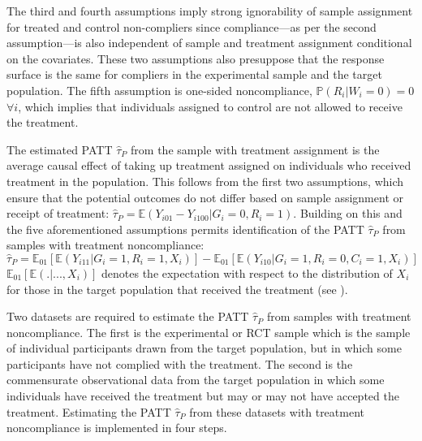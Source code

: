 The third and fourth assumptions imply strong ignorability of sample
assignment for treated and control non-compliers since compliance---as
per the second assumption---is also independent of sample and treatment
assignment conditional on the covariates. These two assumptions also
presuppose that the response surface is the same for compliers in the
experimental sample and the target population. The fifth assumption is
one-sided noncompliance, \(\mathbb{P}(R_{i}|W_{i}=0)=0\) \(\forall i\),
which implies that individuals assigned to control are not allowed to
receive the treatment.

The estimated PATT \(\widehat{\tau}_{P}\) from the sample with treatment
assignment is the average causal effect of taking up treatment assigned
on individuals who received treatment in the population. This follows
from the first two assumptions, which ensure that the potential outcomes
do not differ based on sample assignment or receipt of treatment:
\(\widehat{\tau}_{P}=\mathbb{E}\left(Y_{i01}-Y_{i100}|G_{i}=0, R_{i}=1\right)\).
Building on this and the five aforementioned assumptions permits
identification of the PATT \(\widehat{\tau}_{P}\) from samples with
treatment noncompliance:
\[\widehat{\tau}_{P}=\mathbb{E}_{01}\left[\mathbb{E}(Y_{i11}|G_{i}=1,R_{i}=1,X_{i})\right]-\mathbb{E}_{01}\left[\mathbb{E}\left(Y_{i10}|G_{i}=1,R_{i}=0,C_{i}=1,X_{i}\right)\right]\]
\(\mathbb{E}_{01}\left[\mathbb{E}\left(.|...,X_{i}\right)\right]\) denotes
the expectation with respect to the distribution of \(X_{i}\) for those in
the target population that received the treatment (see
\citep[ 111]{ottoboni2020PATT}).

Two datasets are required to estimate the PATT \(\widehat{\tau}_{P}\) from
samples with treatment noncompliance. The first is the experimental or
RCT sample which is the sample of individual participants drawn from the
target population, but in which some participants have not complied with
the treatment. The second is the commensurate observational data from
the target population in which some individuals have received the
treatment but may or may not have accepted the treatment. Estimating the
PATT \(\widehat{\tau}_{P}\) from these datasets with treatment
noncompliance is implemented in four steps.


